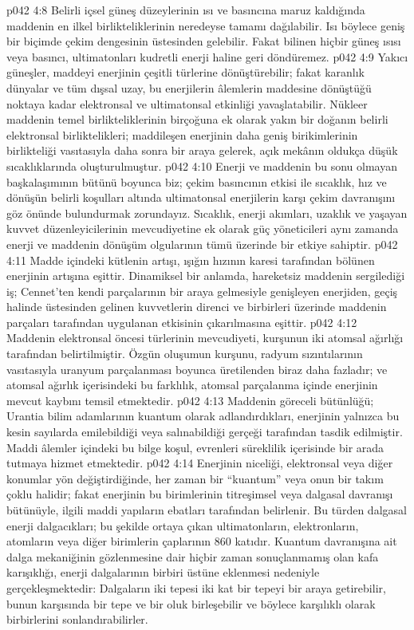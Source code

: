 \vs p042 4:8 Belirli içsel güneş düzeylerinin ısı ve basıncına maruz kaldığında maddenin en ilkel birlikteliklerinin neredeyse tamamı dağılabilir. Isı böylece geniş bir biçimde çekim dengesinin üstesinden gelebilir. Fakat bilinen hiçbir güneş ısısı veya basıncı, ultimatonları kudretli enerji haline geri döndüremez.
\vs p042 4:9 Yakıcı güneşler, maddeyi enerjinin çeşitli türlerine dönüştürebilir; fakat karanlık dünyalar ve tüm dışsal uzay, bu enerjilerin âlemlerin maddesine dönüştüğü noktaya kadar elektronsal ve ultimatonsal etkinliği yavaşlatabilir. Nükleer maddenin temel birlikteliklerinin birçoğuna ek olarak yakın bir doğanın belirli elektronsal birliktelikleri; maddileşen enerjinin daha geniş birikimlerinin birlikteliği vasıtasıyla daha sonra bir araya gelerek, açık mekânın oldukça düşük sıcaklıklarında oluşturulmuştur.
\vs p042 4:10 Enerji ve maddenin bu sonu olmayan başkalaşımının bütünü boyunca biz; çekim basıncının etkisi ile sıcaklık, hız ve dönüşün belirli koşulları altında ultimatonsal enerjilerin karşı çekim davranışını göz önünde bulundurmak zorundayız. Sıcaklık, enerji akımları, uzaklık ve yaşayan kuvvet düzenleyicilerinin mevcudiyetine ek olarak güç yöneticileri aynı zamanda enerji ve maddenin dönüşüm olgularının tümü üzerinde bir etkiye sahiptir.
\vs p042 4:11 Madde içindeki kütlenin artışı, ışığın hızının karesi tarafından bölünen enerjinin artışına eşittir. Dinamiksel bir anlamda, hareketsiz maddenin sergilediği iş; Cennet’ten kendi parçalarının bir araya gelmesiyle genişleyen enerjiden, geçiş halinde üstesinden gelinen kuvvetlerin direnci ve birbirleri üzerinde maddenin parçaları tarafından uygulanan etkisinin çıkarılmasına eşittir.
\vs p042 4:12 Maddenin elektronsal öncesi türlerinin mevcudiyeti, kurşunun iki atomsal ağırlığı tarafından belirtilmiştir. Özgün oluşumun kurşunu, radyum sızıntılarının vasıtasıyla uranyum parçalanması boyunca üretilenden biraz daha fazladır; ve atomsal ağırlık içerisindeki bu farklılık, atomsal parçalanma içinde enerjinin mevcut kaybını temsil etmektedir.
\vs p042 4:13 Maddenin göreceli bütünlüğü; Urantia bilim adamlarının kuantum olarak adlandırdıkları, enerjinin yalnızca bu kesin sayılarda emilebildiği veya salınabildiği gerçeği tarafından tasdik edilmiştir. Maddi âlemler içindeki bu bilge koşul, evrenleri süreklilik içerisinde bir arada tutmaya hizmet etmektedir.
\vs p042 4:14 Enerjinin niceliği, elektronsal veya diğer konumlar yön değiştirdiğinde, her zaman bir “kuantum” veya onun bir takım çoklu halidir; fakat enerjinin bu birimlerinin titreşimsel veya dalgasal davranışı bütünüyle, ilgili maddi yapıların ebatları tarafından belirlenir. Bu türden dalgasal enerji dalgacıkları; bu şekilde ortaya çıkan ultimatonların, elektronların, atomların veya diğer birimlerin çaplarının 860 katıdır. Kuantum davranışına ait dalga mekaniğinin gözlenmesine dair hiçbir zaman sonuçlanmamış olan kafa karışıklığı, enerji dalgalarının birbiri üstüne eklenmesi nedeniyle gerçekleşmektedir: Dalgaların iki tepesi iki kat bir tepeyi bir araya getirebilir, bunun karşısında bir tepe ve bir oluk birleşebilir ve böylece karşılıklı olarak birbirlerini sonlandırabilirler.
